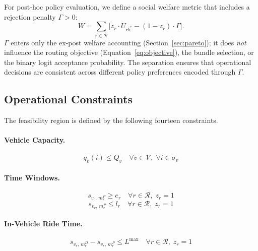 For post-hoc policy evaluation, we define a social welfare metric that includes a
rejection penalty $\Gamma > 0$:
\begin{equation}\label{eq:welfare}
  W = \sum_{r \in \mathcal{R}} \bigl[ z_r \cdot U_{rb^*} - (1 - z_r) \cdot \Gamma \bigr].
\end{equation}
$\Gamma$ enters only the ex-post welfare accounting (Section~\ref{sec:pareto}); it does
\emph{not} influence the routing objective (Equation~\ref{eq:objective}), the bundle
selection, or the binary logit acceptance probability. The separation ensures that
operational decisions are consistent across different policy preferences encoded
through $\Gamma$.

\subsection{Operational Constraints}

The feasibility region is defined by the following fourteen constraints.

\paragraph{Vehicle Capacity.}
\begin{equation}\label{con:capacity}
  q_v(i) \leq Q_v \quad \forall v \in \mathcal{V},\; \forall i \in \sigma_v
\end{equation}

\paragraph{Time Windows.}
\begin{equation}\label{con:tw-early}
  s_{v_r,\, m_r^P} \geq e_r \quad \forall r \in \mathcal{R},\; z_r = 1
\end{equation}
\begin{equation}\label{con:tw-late}
  s_{v_r,\, m_r^P} \leq l_r \quad \forall r \in \mathcal{R},\; z_r = 1
\end{equation}

\paragraph{In-Vehicle Ride Time.}
\begin{equation}\label{con:ridetime}
  s_{v_r,\, m_r^D} - s_{v_r,\, m_r^P} \leq L^{\max} \quad \forall r \in \mathcal{R},\; z_r = 1
\end{equation}

